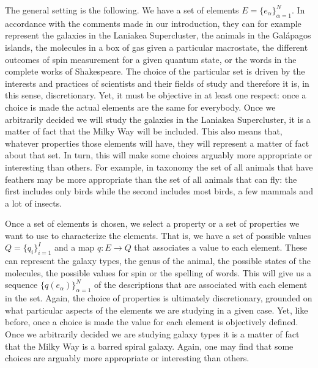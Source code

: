 \documentclass{article}
\begin{document}
The general setting is the following. We have a set of elements $E = \{e_\alpha\}_{\alpha=1}^N$. In accordance with the comments made in our introduction, they can for example represent the galaxies in the Laniakea Supercluster, the animals in the Gal\'{a}pagos islands, the molecules in a box of gas given a particular macrostate, the different outcomes of spin measurement for a given quantum state, or the words in the complete works of Shakespeare. The choice of the particular set is driven by the interests and practices of scientists and their fields of study and therefore it is, in this sense, discretionary. Yet, it must be objective in at least one respect: once a choice is made the actual elements are the same for everybody. Once we arbitrarily decided we will study the galaxies in the Laniakea Supercluster, it is a matter of fact that the Milky Way will be included. This also means that, whatever properties those elements will have, they will represent a matter of fact about that set. In turn, this will make some choices arguably more appropriate or interesting than others. For example, in taxonomy the set of all animals that have feathers may be more appropriate than the set of all animals that can fly: the first includes only birds while the second includes most birds, a few mammals and a lot of insects.

Once a set of elements is chosen, we select a property or a set of properties we want to use to characterize the elements. That is, we have a set of possible values $Q=\{q_i\}_{i=1}^I$ and a map $q : E \to Q$ that associates a value to each element. These can represent the galaxy types, the genus of the animal, the possible states of the molecules, the possible values for spin or the spelling of words. This will give us a sequence $\{q(e_\alpha)\}_{\alpha=1}^N$ of the descriptions that are associated with each element in the set. Again, the choice of properties is ultimately discretionary, grounded on what particular aspects of the elements we are studying in a given case. Yet, like before, once a choice is made the value for each element is objectively defined. Once we arbitrarily decided we are studying galaxy types it is a matter of fact that the Milky Way is a barred spiral galaxy. Again, one may find that some choices are arguably more appropriate or interesting than others.
\end{document}
